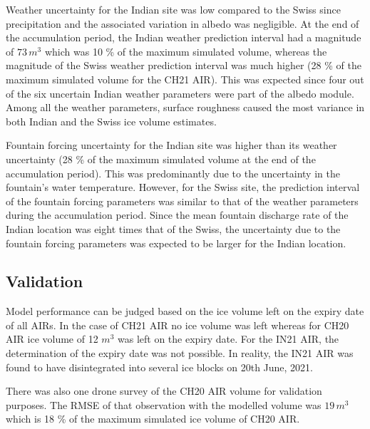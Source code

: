 Weather uncertainty for the Indian site was low compared to the Swiss since precipitation and the associated
variation in albedo was negligible. At the end of the accumulation period, the Indian weather prediction
interval had a magnitude of  $73\,m^3$ which was 10 \% of the maximum simulated volume, whereas the magnitude of
the Swiss weather prediction interval was much higher (28 \% of the maximum simulated volume for the CH21 AIR).
This was expected since four out of the six uncertain Indian weather parameters were part of the albedo module. Among
all the weather parameters, surface roughness caused the most variance in both Indian and the Swiss ice
volume estimates.

Fountain forcing uncertainty for the Indian site was higher than its weather uncertainty (28 \% of the maximum
simulated volume at the end of the accumulation period). This was predominantly due to the uncertainty in the
fountain's water temperature. However, for the Swiss site, the prediction interval of the fountain forcing
parameters was similar to that of the weather parameters during the accumulation period. Since the mean fountain
discharge rate of the Indian location was eight times that of the Swiss, the uncertainty due to the fountain
forcing parameters was expected to be larger for the Indian location.

\subsection{Validation}

Model performance can be judged based on the ice volume left on the expiry date of all \ac{AIRs}. In the case of CH21
AIR no ice volume was left whereas for CH20 AIR ice volume of 12 $m^3$ was left on the expiry date. For the IN21
AIR, the determination of the expiry date was not possible. In reality, the IN21 AIR was found to have
disintegrated into several ice blocks on 20th June, 2021. 

There was also one drone survey of the CH20 AIR volume for validation purposes. The RMSE of that observation
with the modelled volume was $19\, m^3$ which is 18 \% of the maximum simulated ice volume of CH20 AIR.

